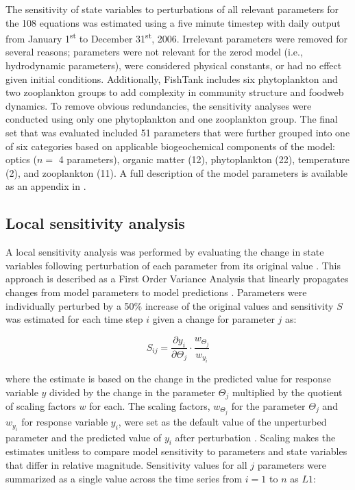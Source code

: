 \documentclass[review]{elsarticle}\usepackage[]{graphicx}\usepackage[]{color}
\begin{document}
The sensitivity of state variables to perturbations of all relevant parameters for the 108 equations was estimated using a five minute timestep with daily output from January 1\textsuperscript{st} to December 31\textsuperscript{st}, 2006. Irrelevant parameters were removed for several reasons; parameters were not relevant for the \ac{zerod} model (i.e., hydrodynamic parameters), were considered physical constants, or had no effect given initial conditions.  Additionally, FishTank includes six phytoplankton and two zooplankton groups to add complexity in community structure and foodweb dynamics. To remove obvious redundancies, the sensitivity analyses were conducted using only one phytoplankton and one zooplankton group.  The final set that was evaluated included 51 parameters that were further grouped into one of six categories based on applicable biogeochemical components of the model: optics ($n = $ 4 parameters), organic matter (12), phytoplankton (22), temperature (2), and zooplankton (11).  A full description of the model parameters is available as an appendix in \citet{Lehrter17}.  

\subsection{Local sensitivity analysis}

A local sensitivity analysis was performed by evaluating the change in state variables following perturbation of each parameter from its original value \citep{Soetaert10,Camacho14b,RDCT17}. This approach is described as a First Order Variance Analysis that linearly propagates changes from model parameters to model predictions \citep{Camacho14b}. Parameters were individually perturbed by a 50\% increase of the original values and sensitivity $S$ was estimated for each time step $i$ given a change for parameter $j$ as:

\begin{equation} \label{sijeqn}
S_{ij} = \frac{\partial y_i}{\partial \Theta_j}\cdot\frac{w_{\Theta_j}}{w_{y_i}}
\end{equation}

\noindent where the estimate is based on the change in the predicted value for response variable $y$ divided by the change in the parameter $\Theta_j$ multiplied by the quotient of scaling factors $w$ for each.  The scaling factors, $w_{\Theta_j}$ for the parameter $\Theta_j$ and $w_{y_i}$ for response variable $y_i$, were set as the default value of the unperturbed parameter and the predicted value of $y_i$ after perturbation \citep{Soetaert10}.  Scaling makes the estimates unitless to compare model sensitivity to parameters and state variables that differ in relative magnitude.  Sensitivity values for all $j$ parameters were summarized as a single value across the time series from $i = 1$ to $n$ as $L1$:
\end{document}
